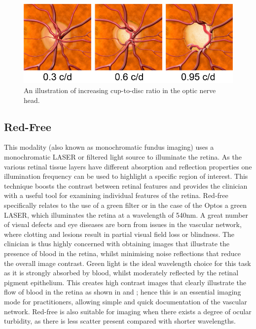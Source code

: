 \begin{figure}[H]
\centering
\includegraphics{figures/opticnervecupping}
\caption{An illustration of increasing cup-to-disc ratio in the optic nerve head.\cite{7_burnett_hodd_2012}}
\label{fig:cup}
   \end{figure}

	

\subsection{Red-Free}

This modality (also known as monochromatic fundus imaging) uses a monochromatic
\gls{LASER} or filtered light source to illuminate the retina. As the various retinal
tissue layers have different absorption and reflection properties one illumination
frequency can be used to highlight a specific region of interest. This technique
boosts the contrast between retinal features and provides the clinician with a
useful tool for examining individual features of the retina. Red-free specifically
relates to the use of a green filter or in the case of the Optos a green \gls{LASER},
which illuminates the retina at a wavelength of 540nm.\cite{4_bennett_2015}
A great number of visual defects and eye diseases are born from issues in
the vascular network, where clotting and lesions result in partial visual
field loss or blindness. The clinician is thus highly concerned with obtaining
images that illustrate the presence of blood in the retina, whilst minimising
noise reflections that reduce the overall image contrast. Green light is the
ideal wavelength choice for this task as it is strongly absorbed by blood,
whilst moderately reflected by the retinal pigment epithelium. This creates
high contrast images that clearly illustrate the flow of blood in the retina
as shown in  and ; hence this is an essential
imaging mode for practitioners, allowing simple and quick documentation of
the vascular network. Red-free is also suitable for imaging when there exists
a degree of ocular turbidity, as there is less scatter present compared with
shorter wavelengths.

